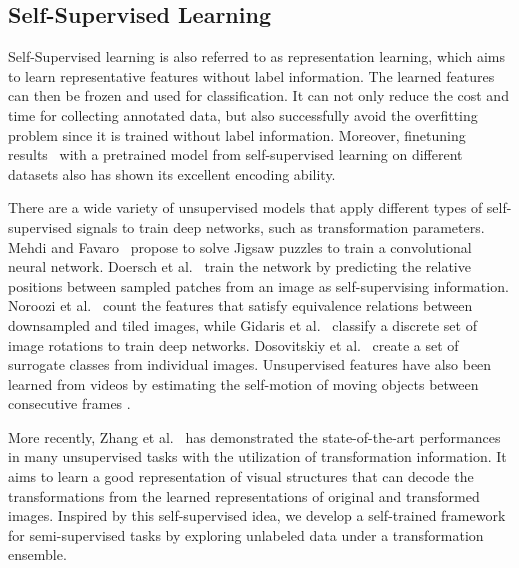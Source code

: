 \documentclass[journal]{IEEEtran}
\begin{document}
\subsection{Self-Supervised Learning}
Self-Supervised learning is also referred to as representation learning, which aims to learn representative features without label information. The learned features can then be frozen and used for classification. It can not only reduce the cost and time for collecting annotated data, but also successfully avoid the overfitting problem since it is trained without label information. Moreover, finetuning results~\cite{he2020momentum} with a pretrained model from self-supervised learning on different datasets also has shown its excellent encoding ability.
\par There are a wide variety of unsupervised models that apply different types of self-supervised signals to train deep networks, such as transformation parameters. Mehdi and Favaro~\cite{noroozi2016unsupervised} propose to solve Jigsaw puzzles to train a convolutional neural network.
Doersch et al.~\cite{doersch2015unsupervised} train the network by predicting the relative positions between sampled patches from an image as self-supervising information. Noroozi et al.~\cite{noroozi2017representation} count the features that satisfy equivalence relations between downsampled and tiled images, while Gidaris et al.~\cite{gidaris2018unsupervised} classify a discrete set of image rotations to train deep networks. Dosovitskiy et al.~\cite{dosovitskiy2014discriminative} create a set of surrogate classes from individual images. Unsupervised features have also been learned from videos by estimating the self-motion of moving objects between consecutive frames \cite{agrawal2015learning}.

More recently, Zhang et al.~\cite{zhang2019aet,qi2020learning} has demonstrated the state-of-the-art performances in many unsupervised tasks with the utilization of transformation information. It aims to learn a good representation of visual structures that can decode the transformations from the learned representations of original and transformed images. Inspired by this self-supervised idea, we develop a self-trained framework for semi-supervised tasks by exploring unlabeled data under a transformation ensemble.
\end{document}
